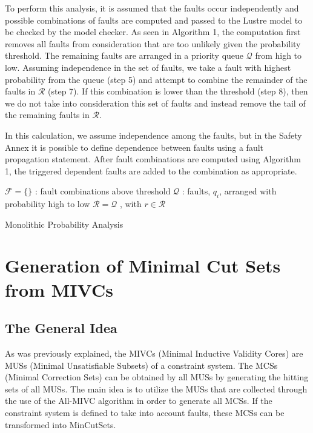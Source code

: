 To perform this analysis, it is assumed that the faults occur independently and possible combinations of faults are computed and passed to the Lustre model to be checked by the model checker. As seen in Algorithm 1, the computation first removes all faults from consideration that are too unlikely given the probability threshold. The remaining faults are arranged in a priority queue $\mathcal{Q}$ from high to low. Assuming independence in the set of faults, we take a fault with highest probability from the queue (step 5) and attempt to combine the remainder of the faults in $\mathcal{R}$ (step 7). If this combination is lower than the threshold (step 8), then we do not take into consideration this set of faults and instead remove the tail of the remaining faults in $\mathcal{R}$. %
 
In this calculation, we assume independence among the faults, but in the Safety Annex it is possible to define dependence between faults using a %
fault propagation statement. After fault combinations are computed using Algorithm 1, the triggered dependent faults are added to the combination as appropriate. 

\begin{algorithm}[H]
	$\mathcal{F} = \{\}$ : fault combinations above threshold \;
	$\mathcal{Q}$ : faults, $q_i$, arranged with probability high to low \;
	$\mathcal{R} = \mathcal{Q}$ , with $r \in \mathcal{R}$\;
	\caption{Monolithic Probability Analysis}
\end{algorithm}

\section{Generation of Minimal Cut Sets from MIVCs}
\subsection{The General Idea}
As was previously explained, the MIVCs (Minimal Inductive Validity Cores) are MUSs (Minimal Unsatisfiable Subsets) of a constraint system. The MCSs (Minimal Correction Sets) can be obtained by all MUSs by generating the hitting sets of all MUSs. The main idea is to utilize the MUSs that are collected through the use of the All-MIVC algorithm in order to generate all MCSs. If the constraint system is defined to take into account faults, these MCSs can be transformed into MinCutSets. 

